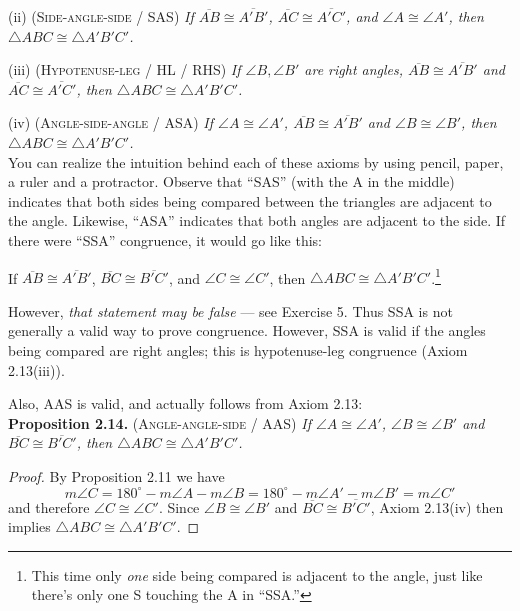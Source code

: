 \documentclass[leqno]{book}
\begin{document}
(ii) \textsc{(Side-angle-side / SAS)} \emph{If $\overline{AB}\cong\overline{A'B'}$, $\overline{AC}\cong\overline{A'C'}$, and $\angle A\cong\angle A'$, then $\triangle ABC\cong\triangle A'B'C'$.}

(iii) \textsc{(Hypotenuse-leg / HL / RHS)} \emph{If $\angle B,\angle B'$ are right angles, $\overline{AB}\cong\overline{A'B'}$ and $\overline{AC}\cong\overline{A'C'}$, then $\triangle ABC\cong\triangle A'B'C'$.}

(iv) \textsc{(Angle-side-angle / ASA)} \emph{If $\angle A\cong\angle A'$, $\overline{AB}\cong\overline{A'B'}$ and $\angle B\cong\angle B'$, then $\triangle ABC\cong\triangle A'B'C'$.}\\

\noindent You can realize the intuition behind each of these axioms by using pencil, paper, a ruler and a protractor.  Observe that ``SAS'' (with the A in the middle) indicates that both sides being compared between the triangles are adjacent to the angle.  Likewise, ``ASA'' indicates that both angles are adjacent to the side.  If there were ``SSA'' congruence, it would go like this:
\begin{center}
If $\overline{AB}\cong\overline{A'B'}$, $\overline{BC}\cong\overline{B'C'}$, and $\angle C\cong\angle C'$, then $\triangle ABC\cong\triangle A'B'C'$.\footnote{This time only \emph{one} side being compared is adjacent to the angle, just like there's only one S touching the A in ``SSA.''}
\end{center}
However, \emph{that statement may be false} \---- see Exercise 5.  Thus SSA is not generally a valid way to prove congruence.  However, SSA is valid if the angles being compared are right angles; this is hypotenuse-leg congruence (Axiom 2.13(iii)).

Also, AAS is valid, and actually follows from Axiom 2.13:\\

\noindent\textbf{Proposition 2.14.} \textsc{(Angle-angle-side / AAS)} \emph{If $\angle A\cong\angle A'$, $\angle B\cong\angle B'$ and $\overline{BC}\cong\overline{B'C'}$, then $\triangle ABC\cong\triangle A'B'C'$.}
\begin{proof}
By Proposition 2.11 we have
$$m\angle C=180^\circ-m\angle A-m\angle B=180^\circ-m\angle A'-m\angle B'=m\angle C'$$
and therefore $\angle C\cong\angle C'$.  Since $\angle B\cong\angle B'$ and $\overline{BC}\cong\overline{B'C'}$, Axiom 2.13(iv) then implies $\triangle ABC\cong\triangle A'B'C'$.
\end{proof}
\end{document}
